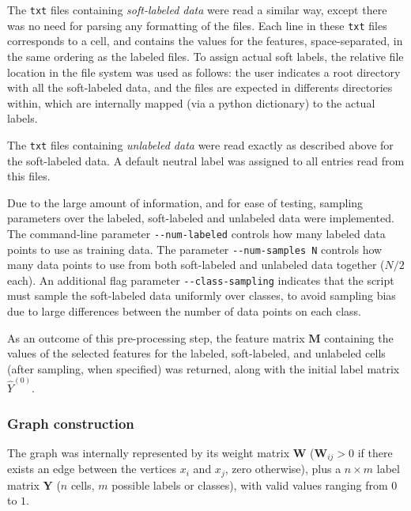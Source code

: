 \documentclass[oneside, a4paper, draft]{memoir} %
\begin{document}
The \texttt{txt} files containing \emph{soft-labeled data} were read a similar way, except there was no need for
parsing any formatting of the files. Each line in these \texttt{txt} files corresponds to a cell, and contains the
values for the features, space-separated, in the same ordering as the labeled files. To assign actual soft labels, the
relative file location in the file system was used as follows: the user indicates a root directory with all the 
soft-labeled data, and the files are expected in differents directories within, which are internally mapped 
(via a python dictionary) to the actual labels.

The \texttt{txt} files containing \emph{unlabeled data} were read exactly as described above for the soft-labeled
data. A default neutral label was assigned to all entries read from this files.

Due to the large amount of information, and for ease of testing, sampling parameters over the labeled, 
soft-labeled and unlabeled data were implemented. The command-line parameter \texttt{-{}-num-labeled}
controls how many labeled data points to use as training data. The parameter \texttt{-{}-num-samples N} controls
how many data points to use from both soft-labeled and unlabeled data together ($N/2$ each). An additional flag
parameter \texttt{-{}-class-sampling} indicates that the script must sample the soft-labeled data uniformly over
classes, to avoid sampling bias due to large differences between the number of data points on each class.

As an outcome of this pre-processing step, the feature matrix $\mathbf{M}$ containing the values of the selected
features for the labeled, soft-labeled, and unlabeled cells (after sampling, when specified) was returned, along with
the initial label matrix $\hat{Y}^{(0)}$.

\subsubsection{Graph construction}
The graph was internally represented by its weight matrix $\mathbf W$ ($\mathbf{W}_{ij}>0$ if there exists
an edge between the vertices $x_i$ and $x_j$, zero otherwise), plus a $n \times m$ label matrix $\mathbf Y$ 
($n$ cells, $m$ possible labels or classes), with valid values ranging from $0$ to $1$.
\end{document}
